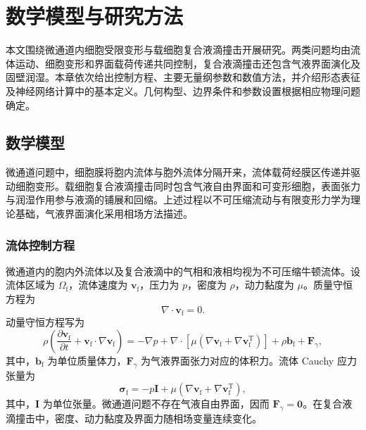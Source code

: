 \chapter{数学模型与研究方法}
\label{cha:chap02}

本文围绕微通道内细胞受限变形与载细胞复合液滴撞击开展研究。两类问题均由流体运动、细胞变形和界面载荷传递共同控制，复合液滴撞击还包含气液界面演化及固壁润湿。本章依次给出控制方程、主要无量纲参数和数值方法，并介绍形态表征及神经网络计算中的基本定义。几何构型、边界条件和参数设置根据相应物理问题确定。

\section{数学模型}
\label{sec:ch2_mathematical_model}

微通道问题中，细胞膜将胞内流体与胞外流体分隔开来，流体载荷经膜区传递并驱动细胞变形。载细胞复合液滴撞击同时包含气液自由界面和可变形细胞，表面张力与润湿作用参与液滴的铺展和回缩。上述过程以不可压缩流动与有限变形力学为理论基础，气液界面演化采用相场方法描述。

\subsection{流体控制方程}
\label{subsec:ch2_fluid}

微通道内的胞内外流体以及复合液滴中的气相和液相均视为不可压缩牛顿流体。设流体区域为 $\Omega_{\mathrm f}$，流体速度为 $\boldsymbol{v}_{\mathrm f}$，压力为 $p$，密度为 $\rho$，动力黏度为 $\mu$。质量守恒方程为
\begin{equation}
\nabla\cdot\boldsymbol{v}_{\mathrm f}=0.
\label{eq:ch2_continuity}
\end{equation}
动量守恒方程写为
\begin{equation}
\rho
\left(
\frac{\partial\boldsymbol{v}_{\mathrm f}}{\partial t}
+
\boldsymbol{v}_{\mathrm f}\cdot\nabla\boldsymbol{v}_{\mathrm f}
\right)
=
-\nabla p
+
\nabla\cdot
\left[
\mu
\left(
\nabla\boldsymbol{v}_{\mathrm f}
+
\nabla\boldsymbol{v}_{\mathrm f}^{\mathrm T}
\right)
\right]
+
\rho\boldsymbol{b}_{\mathrm f}
+
\boldsymbol{F}_{\gamma},
\label{eq:ch2_fluid_momentum}
\end{equation}
其中，$\boldsymbol{b}_{\mathrm f}$ 为单位质量体力，$\boldsymbol{F}_{\gamma}$ 为气液界面张力对应的体积力。流体 Cauchy 应力张量为
\begin{equation}
\boldsymbol{\sigma}_{\mathrm f}
=
-p\boldsymbol{I}
+
\mu
\left(
\nabla\boldsymbol{v}_{\mathrm f}
+
\nabla\boldsymbol{v}_{\mathrm f}^{\mathrm T}
\right),
\label{eq:ch2_fluid_stress}
\end{equation}
其中，$\boldsymbol{I}$ 为单位张量。微通道问题不存在气液自由界面，因而 $\boldsymbol{F}_{\gamma}=\boldsymbol{0}$。在复合液滴撞击中，密度、动力黏度及界面力随相场变量连续变化。

